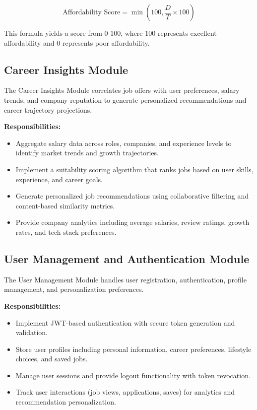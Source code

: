 \documentclass[12pt,a4paper,oneside]{report}
\begin{document}
\begin{equation}
\text{Affordability Score} = \min\left(100, \frac{D}{T} \times 100\right)
\end{equation}

This formula yields a score from 0-100, where 100 represents excellent affordability and 0 represents poor affordability.

\subsection{Career Insights Module}

The Career Insights Module correlates job offers with user preferences, salary trends, and company reputation to generate personalized recommendations and career trajectory projections.

\textbf{Responsibilities:}
\begin{itemize}
    \item Aggregate salary data across roles, companies, and experience levels to identify market trends and growth trajectories.
    \item Implement a suitability scoring algorithm that ranks jobs based on user skills, experience, and career goals.
    \item Generate personalized job recommendations using collaborative filtering and content-based similarity metrics.
    \item Provide company analytics including average salaries, review ratings, growth rates, and tech stack preferences.
\end{itemize}

\subsection{User Management and Authentication Module}

The User Management Module handles user registration, authentication, profile management, and personalization preferences.

\textbf{Responsibilities:}
\begin{itemize}
    \item Implement JWT-based authentication with secure token generation and validation.
    \item Store user profiles including personal information, career preferences, lifestyle choices, and saved jobs.
    \item Manage user sessions and provide logout functionality with token revocation.
    \item Track user interactions (job views, applications, saves) for analytics and recommendation personalization.
\end{itemize}
\end{document}
